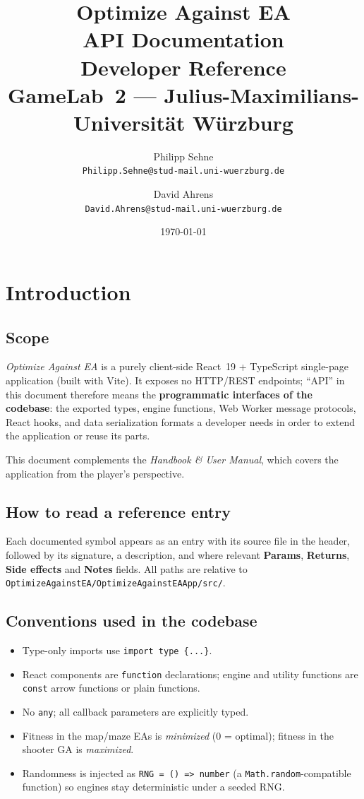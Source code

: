 \documentclass[11pt,a4paper]{report}
\title{\Huge\textbf{Optimize Against EA}\\[1ex]
       \LARGE API Documentation\\[0.5ex]
       \large Developer Reference\\[2ex]
       \large GameLab~2 --- Julius-Maximilians-Universität Würzburg}
\author{Philipp Sehne \\ \small\texttt{Philipp.Sehne@stud-mail.uni-wuerzburg.de}
   \and David Ahrens  \\ \small\texttt{David.Ahrens@stud-mail.uni-wuerzburg.de}}
\date{\today}
\newcommand{\srcfile}[1]{\texttt{\small #1}}   %
\newcommand{\ts}[1]{\texttt{#1}}               %
\begin{document}
\maketitle
\tableofcontents

\chapter{Introduction}

\section{Scope}

\emph{Optimize Against EA} is a purely client-side React~19 + TypeScript
single-page application (built with Vite). It exposes no HTTP/REST endpoints;
``API'' in this document therefore means the \textbf{programmatic interfaces
of the codebase}: the exported types, engine functions, Web Worker message
protocols, React hooks, and data serialization formats a developer needs in
order to extend the application or reuse its parts.

This document complements the \emph{Handbook \& User Manual}, which covers
the application from the player's perspective.

\section{How to read a reference entry}

Each documented symbol appears as an entry with its source file in the
header, followed by its signature, a description, and where relevant
\textbf{Params}, \textbf{Returns}, \textbf{Side effects} and \textbf{Notes}
fields. All paths are relative to
\srcfile{OptimizeAgainstEA/OptimizeAgainstEAApp/src/}.

\section{Conventions used in the codebase}

\begin{itemize}
  \item Type-only imports use \ts{import type \{...\}}.
  \item React components are \ts{function} declarations; engine and utility
        functions are \ts{const} arrow functions or plain functions.
  \item No \ts{any}; all callback parameters are explicitly typed.
  \item Fitness in the map/maze EAs is \emph{minimized} (0 = optimal);
        fitness in the shooter GA is \emph{maximized}.
  \item Randomness is injected as \ts{RNG = () => number} (a
        \ts{Math.random}-compatible function) so engines stay deterministic
        under a seeded RNG.
\end{itemize}
\end{document}
